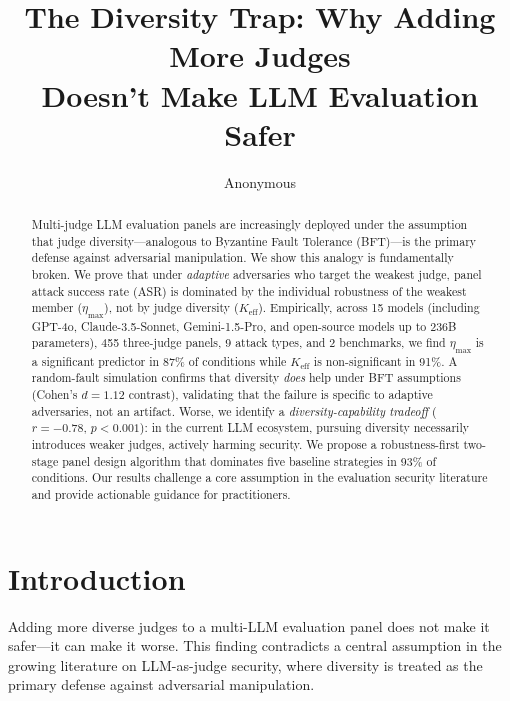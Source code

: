 \documentclass[11pt]{article}
\title{The Diversity Trap: Why Adding More Judges\\Doesn't Make LLM Evaluation Safer}
\author{Anonymous}
\date{}
\begin{document}
\maketitle

\begin{abstract}
Multi-judge LLM evaluation panels are increasingly deployed under the assumption that judge diversity---analogous to Byzantine Fault Tolerance (BFT)---is the primary defense against adversarial manipulation. We show this analogy is fundamentally broken. We prove that under \emph{adaptive} adversaries who target the weakest judge, panel attack success rate (ASR) is dominated by the individual robustness of the weakest member ($\eta_{\max}$), not by judge diversity ($K_{\text{eff}}$). Empirically, across 15 models (including GPT-4o, Claude-3.5-Sonnet, Gemini-1.5-Pro, and open-source models up to 236B parameters), 455 three-judge panels, 9 attack types, and 2 benchmarks, we find $\eta_{\max}$ is a significant predictor in 87\% of conditions while $K_{\text{eff}}$ is non-significant in 91\%. A random-fault simulation confirms that diversity \emph{does} help under BFT assumptions (Cohen's $d = 1.12$ contrast), validating that the failure is specific to adaptive adversaries, not an artifact. Worse, we identify a \emph{diversity-capability tradeoff} ($r = -0.78$, $p < 0.001$): in the current LLM ecosystem, pursuing diversity necessarily introduces weaker judges, actively harming security. We propose a robustness-first two-stage panel design algorithm that dominates five baseline strategies in 93\% of conditions. Our results challenge a core assumption in the evaluation security literature and provide actionable guidance for practitioners.
\end{abstract}

\section{Introduction}

Adding more diverse judges to a multi-LLM evaluation panel does not make it safer---it can make it worse. This finding contradicts a central assumption in the growing literature on LLM-as-judge security, where diversity is treated as the primary defense against adversarial manipulation.
\end{document}
